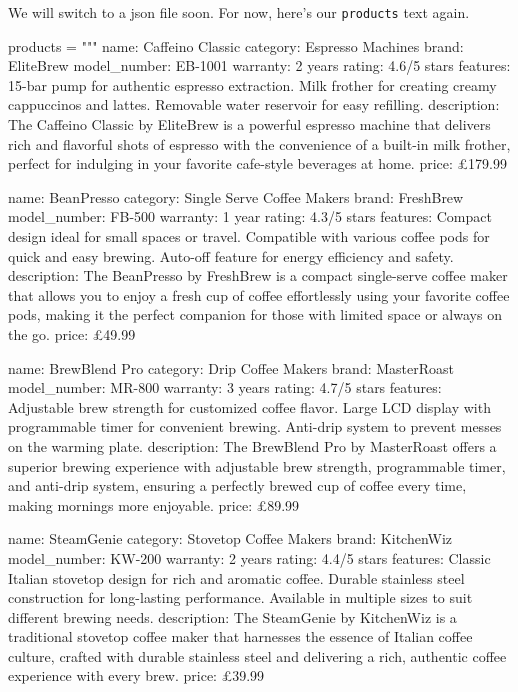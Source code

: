 \documentclass[
  letterpaper,
  DIV=11,
  numbers=noendperiod]{scrreprt}
\newenvironment{Shaded}{\begin{snugshade}}{\end{snugshade}}
\newcommand{\NormalTok}[1]{\textcolor[rgb]{0.00,0.23,0.31}{#1}}
\newcommand{\OperatorTok}[1]{\textcolor[rgb]{0.37,0.37,0.37}{#1}}
\newcommand{\StringTok}[1]{\textcolor[rgb]{0.13,0.47,0.30}{#1}}
\begin{document}
We will switch to a json file soon. For now, here's our
\texttt{products} text again.

\begin{Shaded}
\begin{Highlighting}[]
\NormalTok{products }\OperatorTok{=} \StringTok{"""}
\StringTok{name: Caffeino Classic}
\StringTok{category: Espresso Machines}
\StringTok{brand: EliteBrew}
\StringTok{model\_number: EB{-}1001}
\StringTok{warranty: 2 years}
\StringTok{rating: 4.6/5 stars}
\StringTok{features:}
\StringTok{  15{-}bar pump for authentic espresso extraction.}
\StringTok{  Milk frother for creating creamy cappuccinos and lattes.}
\StringTok{  Removable water reservoir for easy refilling.}
\StringTok{description: The Caffeino Classic by EliteBrew is a powerful espresso machine that delivers rich and flavorful shots of espresso with the convenience of a built{-}in milk frother, perfect for indulging in your favorite cafe{-}style beverages at home.}
\StringTok{price: £179.99}

\StringTok{name: BeanPresso}
\StringTok{category: Single Serve Coffee Makers}
\StringTok{brand: FreshBrew}
\StringTok{model\_number: FB{-}500}
\StringTok{warranty: 1 year}
\StringTok{rating: 4.3/5 stars}
\StringTok{features:}
\StringTok{  Compact design ideal for small spaces or travel.}
\StringTok{  Compatible with various coffee pods for quick and easy brewing.}
\StringTok{  Auto{-}off feature for energy efficiency and safety.}
\StringTok{description: The BeanPresso by FreshBrew is a compact single{-}serve coffee maker that allows you to enjoy a fresh cup of coffee effortlessly using your favorite coffee pods, making it the perfect companion for those with limited space or always on the go.}
\StringTok{price: £49.99}

\StringTok{name: BrewBlend Pro}
\StringTok{category: Drip Coffee Makers}
\StringTok{brand: MasterRoast}
\StringTok{model\_number: MR{-}800}
\StringTok{warranty: 3 years}
\StringTok{rating: 4.7/5 stars}
\StringTok{features:}
\StringTok{  Adjustable brew strength for customized coffee flavor.}
\StringTok{  Large LCD display with programmable timer for convenient brewing.}
\StringTok{  Anti{-}drip system to prevent messes on the warming plate.}
\StringTok{description: The BrewBlend Pro by MasterRoast offers a superior brewing experience with adjustable brew strength, programmable timer, and anti{-}drip system, ensuring a perfectly brewed cup of coffee every time, making mornings more enjoyable.}
\StringTok{price: £89.99}

\StringTok{name: SteamGenie}
\StringTok{category: Stovetop Coffee Makers}
\StringTok{brand: KitchenWiz}
\StringTok{model\_number: KW{-}200}
\StringTok{warranty: 2 years}
\StringTok{rating: 4.4/5 stars}
\StringTok{features:}
\StringTok{  Classic Italian stovetop design for rich and aromatic coffee.}
\StringTok{  Durable stainless steel construction for long{-}lasting performance.}
\StringTok{  Available in multiple sizes to suit different brewing needs.}
\StringTok{description: The SteamGenie by KitchenWiz is a traditional stovetop coffee maker that harnesses the essence of Italian coffee culture, crafted with durable stainless steel and delivering a rich, authentic coffee experience with every brew.}
\StringTok{price: £39.99}


\end{Highlighting}
\end{Shaded}
\end{document}
